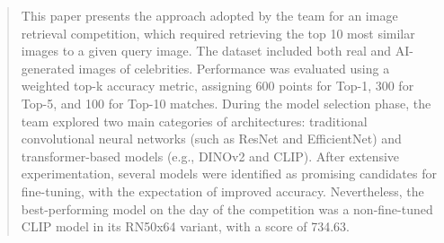 \begin{abstract}
This paper presents the approach adopted by the team for an image retrieval competition, which required retrieving the top 10 most similar images to a given query image. The dataset included both real and AI-generated images of celebrities. Performance was evaluated using a weighted top-k accuracy metric, assigning 600 points for Top-1, 300 for Top-5, and 100 for Top-10 matches.
During the model selection phase, the team explored two main categories of architectures: traditional convolutional neural networks (such as ResNet and EfficientNet) and transformer-based models (e.g., DINOv2 and CLIP). After extensive experimentation, several models were identified as promising candidates for fine-tuning, with the expectation of improved accuracy. Nevertheless, the best-performing model on the day of the competition was a non-fine-tuned CLIP model in its  RN50x64 variant, with a score of 734.63.
\end{abstract}